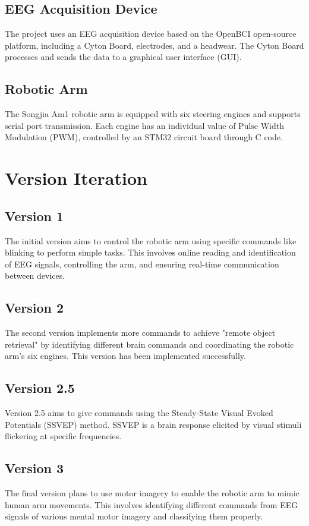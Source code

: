 \documentclass[12pt]{report}
\begin{document}
\section{EEG Acquisition Device}
The project uses an EEG acquisition device based on the OpenBCI open-source platform, including a Cyton Board, electrodes, and a headwear. The Cyton Board processes and sends the data to a graphical user interface (GUI).

\section{Robotic Arm}
The Songjia Am1 robotic arm is equipped with six steering engines and supports serial port transmission. Each engine has an individual value of Pulse Width Modulation (PWM), controlled by an STM32 circuit board through C code.

\chapter{Version Iteration}
\section{Version 1}
The initial version aims to control the robotic arm using specific commands like blinking to perform simple tasks. This involves online reading and identification of EEG signals, controlling the arm, and ensuring real-time communication between devices.

\section{Version 2}
The second version implements more commands to achieve "remote object retrieval" by identifying different brain commands and coordinating the robotic arm's six engines. This version has been implemented successfully.

\section{Version 2.5}
Version 2.5 aims to give commands using the Steady-State Visual Evoked Potentials (SSVEP) method. SSVEP is a brain response elicited by visual stimuli flickering at specific frequencies.

\section{Version 3}
The final version plans to use motor imagery to enable the robotic arm to mimic human arm movements. This involves identifying different commands from EEG signals of various mental motor imagery and classifying them properly.
\end{document}
